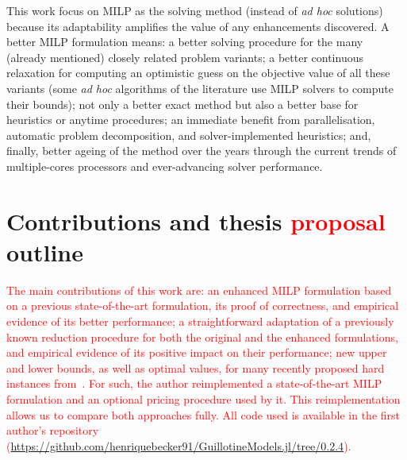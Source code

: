 \documentclass[ppgc,tese,english,formais,babel]{iiufrgs}
\newif\iffinalversion
\newcommand{\newtext}[1]{\iffinalversion%
#1%
\else%
\textcolor{blue}{#1}%
\fi%
}
\newcommand{\oldtext}[1]{\iffinalversion%
\else%
\textcolor{red}{#1}%
\fi%
}
\begin{document}
This work focus on MILP as the solving method (instead of \emph{ad hoc} solutions) because its adaptability amplifies the value of any enhancements discovered.
A better MILP formulation means:
a better solving procedure for the many (already mentioned) closely related problem variants;
a better continuous relaxation for computing an optimistic guess on the objective value of all these variants (some \emph{ad hoc} algorithms of the literature use MILP solvers to compute their bounds);
not only a better exact method but also a better base for heuristics or anytime procedures;
an immediate benefit from parallelisation, automatic problem decomposition, and solver-implemented heuristics;
and, finally, better ageing of the method over the years through the current trends of multiple-cores processors and ever-advancing solver performance.

\section{Contributions and thesis \oldtext{proposal} outline}
\label{sec:contributions}

\oldtext{
The main contributions of this work are:
an enhanced MILP formulation based on a previous state-of-the-art formulation, its proof of correctness, and empirical evidence of its better performance;
a straightforward adaptation of a previously known reduction procedure for both the original and the enhanced formulations, and empirical evidence of its positive impact on their performance;
new upper and lower bounds, as well as optimal values, for many recently proposed hard instances from~\citet{velasco:2019}.
For such, the author reimplemented a state-of-the-art MILP formulation and an optional pricing procedure used by it.
This reimplementation allows us to compare both approaches fully.
All code used is available in the first author's repository ({\small\url{https://github.com/henriquebecker91/GuillotineModels.jl/tree/0.2.4}}).}
\end{document}

